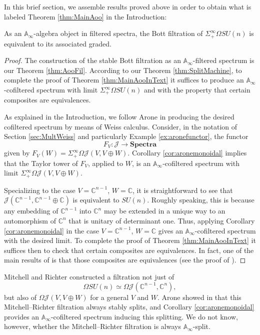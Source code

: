 In this brief section, we assemble results proved above in order to obtain what is labeled Theorem \ref{thm:MainAoo} in the Introduction:

\begin{thm} \label{thm:MainAooInText}
As an $\mathbb{A}_\infty$-algebra object in filtered spectra, the Bott filtration of $\Sigma^{\infty}_+ \Omega SU(n)$ is equivalent to its associated graded.
\end{thm}

\begin{proof}
The construction of the stable Bott filtration as an $\mathbb{A}_\infty$-filtered spectrum is our Theorem \ref{thm:AooFil}.  According to our Theorem \ref{thm:SplitMachine}, to complete the proof of Theorem \ref{thm:MainAooInText} it suffices to produce an $\mathbb{A}_\infty$-cofiltered spectrum with limit $\Sigma^{\infty}_+ \Omega SU(n)$ and with the property that certain composites are equivalences.

As explained in the Introduction, we follow Arone \cite{Arone} in producing the desired cofiltered spectrum by means of Weiss calculus.  Consider, in the notation of Section \ref{sec:MultWeiss} and particularly Example \ref{ex:aronefunctor}, the functor $$F_V:\mathcal{J} \longrightarrow \textbf{Spectra}$$ given by $F_V(W) = \Sigma^{\infty}_+ \Omega \mathcal{J}(V, V \oplus W)$.  Corollary \ref{cor:aronemonoidal} implies that the Taylor tower of $F_V$, applied to $W$, is an $\mathbb{A}_\infty$-cofiltered spectrum with limit $\Sigma^{\infty}_+ \Omega \mathcal{J}(V,V \oplus W)$.

Specializing to the case $V=\mathbb{C}^{n-1}$, $W=\mathbb{C}$, it is straightforward to see that $\mathcal{J}(\mathbb{C}^{n-1},\mathbb{C}^{n-1} \oplus \mathbb{C})$ is equivalent to $SU(n)$.  Roughly speaking, this is because any embedding of $\mathbb{C}^{n-1}$ into $\mathbb{C}^n$ may be extended in a unique way to an automorphism of $\mathbb{C}^n$ that is unitary of determinant one.  Thus, applying Corollary \ref{cor:aronemonoidal} in the case $V=\mathbb{C}^{n-1}$, $W=\mathbb{C}$ gives an $\mathbb{A}_\infty$-cofiltered spectrum with the desired limit.  To complete the proof of Theorem \ref{thm:MainAooInText} it suffices then to check that certain composites are equivalences.  In fact, one of the main results of \cite{Arone} is that those composites are equivalences (see the proof of \cite[Theorem 1.2]{Arone}).
\end{proof}

\begin{rmk}
Mitchell and Richter constructed \cite{CrabbBarcelona} a filtration not just of $$\Omega SU(n) \simeq \Omega \mathcal{J}(\mathbb{C}^{n-1},\mathbb{C}^n),$$ but also of $\Omega \mathcal{J}(V,V\oplus W)$ for a general $V$ and $W$.  Arone showed in \cite[Theorem 1.2]{Arone} that this Mitchell--Richter filtration always stably splits, and Corollary \ref{cor:aronemonoidal} provides an $\mathbb{A}_\infty$-cofiltered spectrum inducing this splitting.  We do not know, however, whether the Mitchell--Richter filtration is always $\mathbb{A}_\infty$-split. 
\end{rmk}